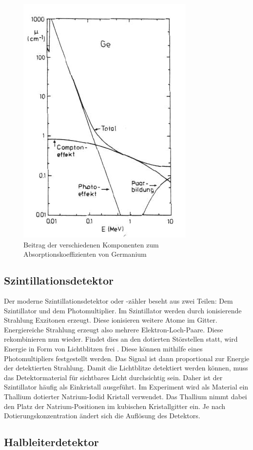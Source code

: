 \documentclass[
	parskip=half,10pt,
	numbers= noenddot, %
	toc=flat, %
	oneside,
	twocolumn,
	]{scrartcl}
\begin{document}
\begin{figure}[h]
\centering
\includegraphics[width=.4\textwidth]{images/absorption.pdf}
\caption{Beitrag der verschiedenen Komponenten zum Absorptionskoeffizienten von Germanium \cite{schatz}}
\label{fig:absorption_2}
\end{figure}



\subsection{Szintillationsdetektor}

Der moderne Szintillationsdetektor oder -zähler beseht aus zwei Teilen: Dem Szintillator und dem Photomultiplier. Im Szintillator werden durch ionisierende Strahlung 
Exzitonen erzeugt. Diese ionisieren weitere Atome im Gitter. Energiereiche Strahlung erzeugt also mehrere Elektron-Loch-Paare. Diese rekombinieren nun wieder. 
Findet dies an den dotierten Störstellen statt, wird Energie in Form von Lichtblitzen frei \cite{kleinknecht}. Diese können mithilfe eines Photomultipliers 
festgestellt werden. Das Signal ist dann proportional zur Energie der detektierten Strahlung. Damit die Lichtblitze detektiert werden können, muss das Detektormaterial 
für sichtbares Licht durchsichtig sein. Daher ist der Szintillator 
häufig als Einkristall ausgeführt. Im Experiment wird als Material ein Thallium dotierter Natrium-Iodid Kristall verwendet. Das Thallium nimmt dabei den Platz der 
Natrium-Positionen im kubischen Kristallgitter ein. Je nach Dotierungskonzentration ändert sich die Auflösung des Detektors. 

\subsection{Halbleiterdetektor}
\end{document}
